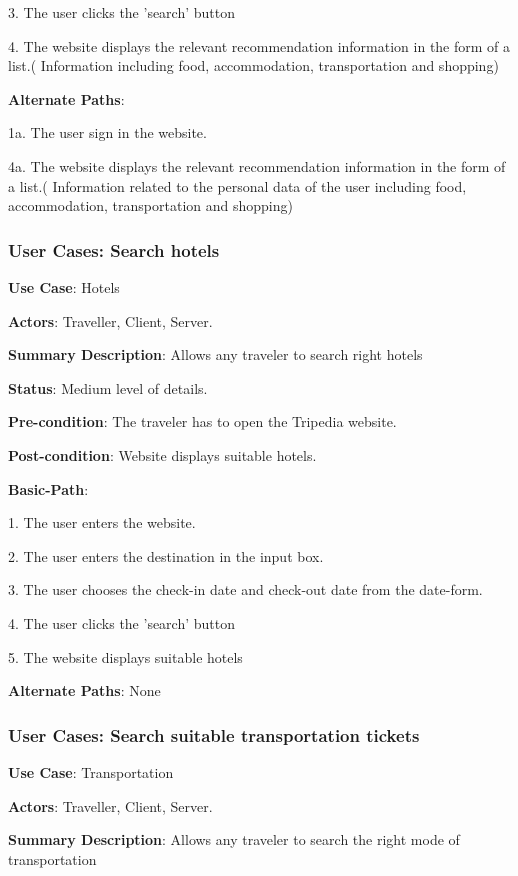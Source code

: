\documentclass[conference]{IEEEtran}
\begin{document}
3. The user clicks the 'search' button

4. The website displays the relevant recommendation information in the form of a list.( Information including food, accommodation, transportation and shopping)

\textbf{Alternate Paths}: 

1a. The user sign in the website.

4a. The website displays the relevant recommendation information in the form of a list.( Information related to the personal data of the user including food, accommodation, transportation and shopping)


\subsubsection{User Cases: Search hotels}

\textbf{ }

\textbf{Use Case}: Hotels

\textbf{Actors}: Traveller, Client, Server.

\textbf{Summary Description}: Allows any traveler to search right hotels

\textbf{Status}: Medium level of details.

\textbf{Pre-condition}: The traveler has to open the Tripedia website.

\textbf{Post-condition}: Website displays suitable hotels.

\textbf{Basic-Path}:

1. The user enters the website.

2. The user enters the destination in the input box.

3. The user chooses the check-in date and check-out date from the date-form.

4. The user clicks the 'search' button

5. The website displays suitable hotels

\textbf{Alternate Paths}: None

\subsubsection{User Cases: Search suitable transportation tickets}

\textbf{ }

\textbf{Use Case}: Transportation

\textbf{Actors}: Traveller, Client, Server.

\textbf{Summary Description}: Allows any traveler to search the right mode of transportation
\end{document}
